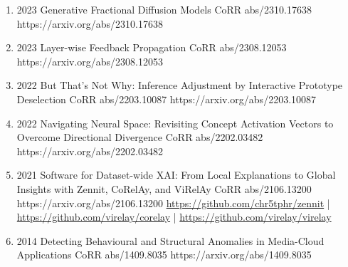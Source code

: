 {\begin{enumerate}
        \item {}
                        {2023}
                        {Generative Fractional Diffusion Models}
                        {CoRR abs/2310.17638}
                        {https://arxiv.org/abs/2310.17638}

        \item {}
                        {2023}
                        {Layer-wise Feedback Propagation}
                        {CoRR abs/2308.12053}
                        {https://arxiv.org/abs/2308.12053}

        \item {}
                        {2022}
                        {But That's Not Why: Inference Adjustment by Interactive Prototype Deselection}
                        {CoRR abs/2203.10087}
                        {https://arxiv.org/abs/2203.10087}

        \item {}
                        {2022}
                        {Navigating Neural Space: Revisiting Concept Activation Vectors to Overcome Directional Divergence}
                        {CoRR abs/2202.03482}
                        {https://arxiv.org/abs/2202.03482}

        \item {}
                        {2021}
                        {Software for Dataset-wide XAI: From Local Explanations to Global Insights with Zennit, CoRelAy, and ViRelAy}
                        {CoRR abs/2106.13200}
                        {https://arxiv.org/abs/2106.13200}
                        {   \href{https://github.com/chr5tphr/zennit}{https://github.com/chr5tphr/zennit} | \\
                            \href{https://github.com/virelay/corelay}{https://github.com/virelay/corelay} |
                            \href{https://github.com/virelay/virelay}{https://github.com/virelay/virelay}
                        }

        \item {}
                        {2014}
                        {Detecting Behavioural and Structural Anomalies in Media-Cloud Applications}
                        {CoRR abs/1409.8035}
                        {https://arxiv.org/abs/1409.8035}

    \end{enumerate}

}
